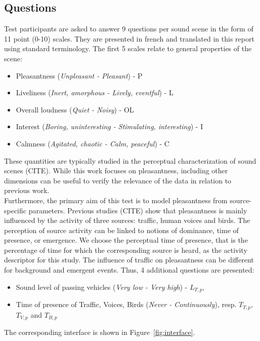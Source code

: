 \documentclass[11pt,a4paper]{article}
\begin{document}
\subsection{Questions}

Test participants are asked to answer 9 questions per sound scene in the form of 11 point (0-10) scales. They are presented in french and translated in this report using standard terminology. The first 5 scales relate to general properties of the scene:
\begin{itemize}
\item Pleasantness (\textit{Unpleasant - Pleasant}) - P
\item Liveliness (\textit{Inert, amorphous - Lively, eventful}) - L
\item Overall loudness (\textit{Quiet - Noisy}) - OL
\item Interest (\textit{Boring, uninteresting - Stimulating, interesting}) - I
\item Calmness (\textit{Agitated, chaotic - Calm, peaceful}) - C
\end{itemize}
These quantities are typically studied in the perceptual characterization of sound scenes (CITE). While this work focuses on pleasantness, including other dimensions can be useful to verify the relevance of the data in relation to previous work.\\
Furthermore, the primary aim of this test is to model pleasantness from source-specific parameters. Previous studies (CITE) show that pleasantness is mainly influenced by the activity of three sources: traffic, human voices and birds. The perception of source activity can be linked to notions of dominance, time of presence,  or emergence. We choose the perceptual time of presence, that is the percentage of time for which the corresponding source is heard, as the activity descriptor for this study. The influence of traffic on pleasantness can be different for background and emergent events. Thus, 4 additional questions are presented:
\begin{itemize}
\item Sound level of passing vehicles (\textit{Very low - Very high}) - $L_{T, p}$,
\item Time of presence of Traffic, Voices, Birds (\textit{Never - Continuously}), resp. $T_{T, p}$, $T_{V, p}$ and $T_{B, p}$
\end{itemize}
The corresponding interface is shown in Figure~\ref{fig:interface}.
\end{document}
